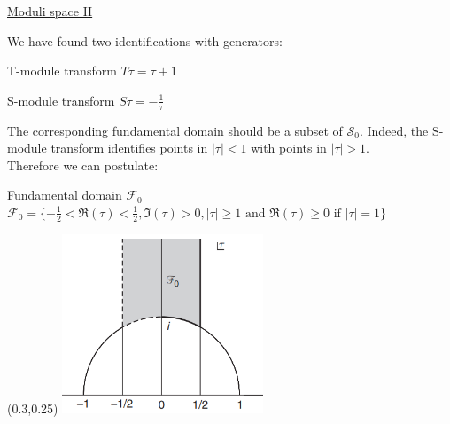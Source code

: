 \documentclass[11pt,aspectratio=169]{beamer}
\begin{document}
\begin{frame}{\underline{Moduli space II}}

	We have found two identifications with generators:
	\begin{block}{T-module transform}
		$T\tau = \tau + 1$
	\end{block}
	\begin{block}{S-module transform}
		$S\tau = -\frac{1}{\tau}$
	\end{block}
	The corresponding fundamental domain should be a subset of $\mathcal{S}_{0}$. Indeed, the S-module transform identifies points in $|\tau| < 1$ with points in $|\tau| > 1$.
	\\
	Therefore we can postulate:
	\begin{block}{Fundamental domain $\mathcal{F}_{0}$}
		$\mathcal{F}_{0} = \{-\frac{1}{2} < \Re(\tau) < \frac{1}{2}, \Im(\tau) > 0, |\tau| \geq 1 \textrm{ and } \Re(\tau) \geq 0 \textrm{ if } |\tau| = 1\}$
	\end{block}
	
\end{frame}


\begin{frame}

	\begin{textblock*}{60mm}(0.3\paperwidth,0.25\paperheight)
		{\tiny \color{accentcolor}
		\includegraphics[width=60mm]{elements/fundamental domain.PNG}\\[2mm]
		}
	\end{textblock*}

	
\end{frame}
\end{document}
